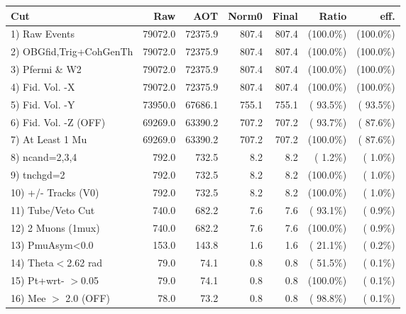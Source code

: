  \begin{table}[h!]\centering
 \begin{tabular}{||l||r|r|r|r|r|r||}
 \hline
 \hline
 Cut & Raw & AOT & Norm0 & Final & Ratio & eff.       \\
 \hline
  1) Raw Events           &      79072.0 &      72375.9 &        807.4 &        807.4 & (100.0\%) & (100.0\%) \\
  2) OBGfid,Trig+CohGenTh &      79072.0 &      72375.9 &        807.4 &        807.4 & (100.0\%) & (100.0\%) \\
  3) Pfermi \& W2         &      79072.0 &      72375.9 &        807.4 &        807.4 & (100.0\%) & (100.0\%) \\
  4) Fid. Vol. -X         &      79072.0 &      72375.9 &        807.4 &        807.4 & (100.0\%) & (100.0\%) \\
  5) Fid. Vol. -Y         &      73950.0 &      67686.1 &        755.1 &        755.1 & ( 93.5\%) & ( 93.5\%) \\
  6) Fid. Vol. -Z (OFF)   &      69269.0 &      63390.2 &        707.2 &        707.2 & ( 93.7\%) & ( 87.6\%) \\
  7) At Least 1 Mu        &      69269.0 &      63390.2 &        707.2 &        707.2 & (100.0\%) & ( 87.6\%) \\
  8) ncand=2,3,4          &        792.0 &        732.5 &          8.2 &          8.2 & (  1.2\%) & (  1.0\%) \\
  9) tnchgd=2             &        792.0 &        732.5 &          8.2 &          8.2 & (100.0\%) & (  1.0\%) \\
 10) +/- Tracks (V0)      &        792.0 &        732.5 &          8.2 &          8.2 & (100.0\%) & (  1.0\%) \\
 11) Tube/Veto Cut        &        740.0 &        682.2 &          7.6 &          7.6 & ( 93.1\%) & (  0.9\%) \\
 12) 2 Muons (1mux)       &        740.0 &        682.2 &          7.6 &          7.6 & (100.0\%) & (  0.9\%) \\
 13) PmuAsym<0.0          &        153.0 &        143.8 &          1.6 &          1.6 & ( 21.1\%) & (  0.2\%) \\
 14) Theta$<$2.62 rad     &         79.0 &         74.1 &          0.8 &          0.8 & ( 51.5\%) & (  0.1\%) \\
 15) Pt+wrt- $>$0.05      &         79.0 &         74.1 &          0.8 &          0.8 & (100.0\%) & (  0.1\%) \\
 16) Mee $>$ 2.0  (OFF)   &         78.0 &         73.2 &          0.8 &          0.8 & ( 98.8\%) & (  0.1\%) \\

\end{tabular}
\end{table}
